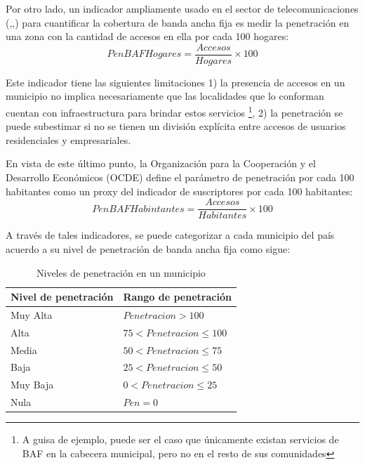 \documentclass[9pt,twocolumn,twoside]{ilcss}
\begin{document}
Por otro lado, un indicador ampliamente usado en el sector de telecomunicaciones (\cite{Hanafizadeh},\cite{IFT2017reb},\cite{IFT2018man}) para cuantificar la cobertura de banda ancha fija es medir la penetración en una zona con la cantidad de accesos en ella por cada 100 hogares:
\begin{equation}
PenBAFHogares = \frac{Accesos }{Hogares} \times 100 
\end{equation}

Este indicador tiene las siguientes limitaciones 1) la presencia de accesos en un municipio no implica necesariamente que las localidades que lo conforman cuentan con infraestructura para brindar estos servicios \footnote{A guisa de ejemplo, puede ser el caso que únicamente existan servicios de BAF en la cabecera municipal, pero no en el resto de sus comunidades}, 2) la penetración se puede subestimar si no se tienen un división explícita entre accesos de usuarios residenciales y empresariales.

En vista de este último punto,  la Organización para la Cooperación y el Desarrollo Económicos (OCDE) define el parámetro de penetración por cada 100 habitantes como un proxy del indicador de suscriptores por cada 100 habitantes:
\begin{equation}
PenBAFHabintantes = \frac{Accesos }{Habitantes} \times 100 
\end{equation}

A través de tales indicadores, se puede categorizar a cada municipio del país acuerdo a su nivel de penetración de banda ancha fija como sigue:
\begin{table}[tbhp]
	\centering
	\caption{Niveles de penetración en un municipio\label{table:clasifpen}}
	\begin{tabular}{@{}ll@{}}
		\toprule
		Nivel de penetración & Rango  de penetración            \\ \midrule
		Muy Alta  & $Penetracion > 100$         \\ 
		Alta      & $75 < Penetracion \leq 100$ \\ 
		Media     & $50 < Penetracion \leq 75$  \\ 
		Baja      & $25 < Penetracion \leq 50$  \\ 
		Muy Baja  & $0 < Penetracion \leq 25$   \\ 
		Nula      & $Pen =0$            \\ \bottomrule
	\end{tabular}

\end{table}
\end{document}
